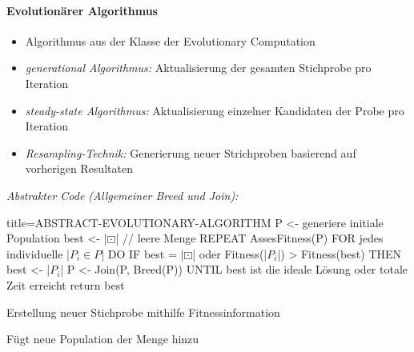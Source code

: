 \documentclass[
    ngerman,
    color=3b,
    load_common, %
    summary,
    boxarc,
]{rubos-tuda-template}
\begin{document}
\paragraph{Evolutionärer Algorithmus}\mbox{}
\begin{idea}\mbox{}
    \begin{itemize}
        \item Algorithmus aus der Klasse der Evolutionary Computation
        \item \textit{generational Algorithmus:} Aktualisierung der gesamten Stichprobe pro Iteration
        \item \textit{steady-state Algorithmus:} Aktualisierung einzelner Kandidaten der Probe pro Iteration
        \item \textit{Resampling-Technik:} Generierung neuer Strichproben basierend auf vorherigen Resultaten
    \end{itemize}
\end{idea}
\textit{Abstrakter Code (Allgemeiner Breed und Join):}
\begin{codeBlock}[autogobble,escapeinside=||]{title={ABSTRACT-EVOLUTIONARY-ALGORITHM}}
    P <- generiere initiale Population
    best <- |$\boxdot$| // leere Menge
    REPEAT
        AssesFitness(P)
        FOR jedes individuelle |$P_i \in P$| DO
            IF best = |$\boxdot$| oder Fitness(|$P_i$|) > Fitness(best) THEN
                best <- |$P_i$|
        P <- Join(P, Breed(P))
    UNTIL best ist die ideale Lösung oder totale Zeit erreicht
    return best
\end{codeBlock}
\begin{description}[leftmargin=2cm]
    \item [Breed] Erstellung neuer Stichprobe mithilfe Fitnessinformation
    \item [Join] Fügt neue Population der Menge hinzu
\end{description}
\end{document}
